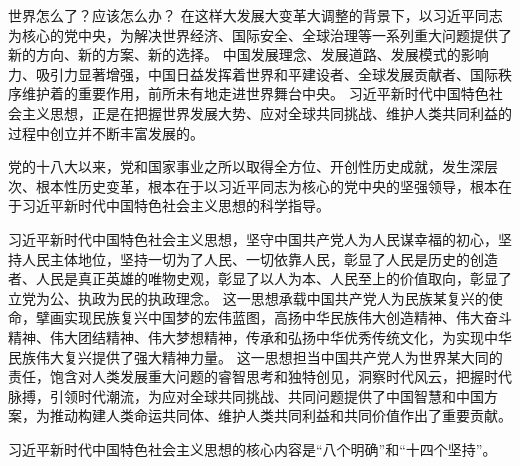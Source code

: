 \documentclass[a4paper, UTF8]{ctexart}
\begin{document}
    世界怎么了？应该怎么办？
    在这样大发展大变革大调整的背景下，以习近平同志为核心的党中央，为解决世界经济、国际安全、全球治理等一系列重大问题提供了新的方向、新的方案、新的选择。
    中国发展理念、发展道路、发展模式的影响力、吸引力显著增强，中国日益发挥着世界和平建设者、全球发展贡献者、国际秩序维护着的重要作用，前所未有地走进世界舞台中央。
    习近平新时代中国特色社会主义思想，正是在把握世界发展大势、应对全球共同挑战、维护人类共同利益的过程中创立并不断丰富发展的。

    党的十八大以来，党和国家事业之所以取得全方位、开创性历史成就，发生深层次、根本性历史变革，根本在于以习近平同志为核心的党中央的坚强领导，根本在于习近平新时代中国特色社会主义思想的科学指导。

    习近平新时代中国特色社会主义思想，坚守中国共产党人为人民谋幸福的初心，坚持人民主体地位，坚持一切为了人民、一切依靠人民，彰显了人民是历史的创造者、人民是真正英雄的唯物史观，彰显了以人为本、人民至上的价值取向，彰显了立党为公、执政为民的执政理念。
    这一思想承载中国共产党人为民族某复兴的使命，擘画实现民族复兴中国梦的宏伟蓝图，高扬中华民族伟大创造精神、伟大奋斗精神、伟大团结精神、伟大梦想精神，传承和弘扬中华优秀传统文化，为实现中华民族伟大复兴提供了强大精神力量。
    这一思想担当中国共产党人为世界某大同的责任，饱含对人类发展重大问题的睿智思考和独特创见，洞察时代风云，把握时代脉搏，引领时代潮流，为应对全球共同挑战、共同问题提供了中国智慧和中国方案，为推动构建人类命运共同体、维护人类共同利益和共同价值作出了重要贡献。

    习近平新时代中国特色社会主义思想的核心内容是“八个明确”和“十四个坚持”。
\end{document}
